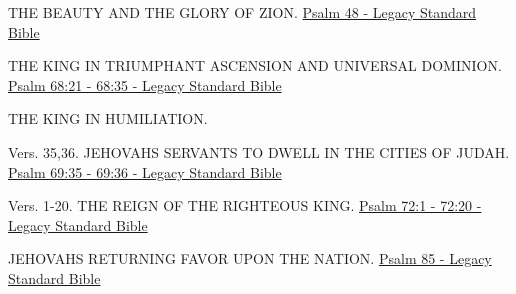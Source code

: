\documentclass[
  ignorenonframetext,
]{beamer}
\begin{document}
\begin{frame}{48}
\label{section-24}
\begin{block}{THE BEAUTY AND THE GLORY OF ZION.}
\label{the-beauty-and-the-glory-of-zion.}
\href{https://read.lsbible.org/?q=ps48}{Psalm 48 - Legacy Standard
Bible}
\end{block}
\end{frame}

\begin{frame}{68}
\label{section-25}
\begin{block}{THE KING IN TRIUMPHANT ASCENSION AND UNIVERSAL DOMINION.}
\label{the-king-in-triumphant-ascension-and-universal-dominion.}
\href{https://read.lsbible.org/?q=ps68\%3A21-35}{Psalm 68:21 - 68:35 -
Legacy Standard Bible}
\end{block}
\end{frame}

\begin{frame}{69}
\label{section-26}
\begin{block}{THE KING IN HUMILIATION.}
\label{the-king-in-humiliation.}
\end{block}

\begin{block}{Vers. 35,36. JEHOVAH\textquotesingle S SERVANTS TO DWELL
IN THE CITIES OF JUDAH.}
\label{vers.-3536.-jehovahs-servants-to-dwell-in-the-cities-of-judah.}
\href{https://read.lsbible.org/?q=ps69\%3A35-36}{Psalm 69:35 - 69:36 -
Legacy Standard Bible}
\end{block}
\end{frame}

\begin{frame}{72}
\label{section-27}
\begin{block}{Vers. 1-20. THE REIGN OF THE RIGHTEOUS KING.}
\label{vers.-1-20.-the-reign-of-the-righteous-king.}
\href{https://read.lsbible.org/?q=ps72\%3A1-20}{Psalm 72:1 - 72:20 -
Legacy Standard Bible}
\end{block}
\end{frame}

\begin{frame}{85}
\label{section-28}
\begin{block}{JEHOVAH\textquotesingle S RETURNING FAVOR UPON THE
NATION.}
\label{jehovahs-returning-favor-upon-the-nation.}
\href{https://read.lsbible.org/?q=ps85}{Psalm 85 - Legacy Standard
Bible}
\end{block}
\end{frame}
\end{document}

